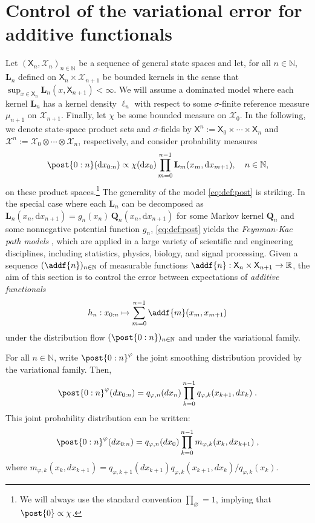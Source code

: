 \documentclass{article}
\newcommand{\Xfd}{\mathcal{X}}
\newcommand{\uksymbol}{\ell}
\newcommand{\ud}[1]{\uksymbol_{#1}}
\newcommand{\nset}{\mathbb{N}}
\newcommand{\1}{\mathbbm{1}}
\newcommand{\uk}[1]{\mathbf{L}_{#1}}
\newcommand{\tensprod}{\otimes}
\newcommand{\Xset}{\mathsf{X}}
\newcommand{\hk}{\kernel{Q}}
\newcommand{\md}[1]{g_{#1}}
\newcommand{\kernel}[1]{\mathbf{#1}}
\newcommand{\rset}{\ensuremath{\mathbb{R}}}
\newcommand{\rmd}{\ensuremath{\mathrm{d}}}
\newcommand{\eqdef}{\ensuremath{:=}}
\newcommand{\eqsp}{\;}
\begin{document}
\section{Control of the variational error for additive functionals}
Let $(\Xset_n, \Xfd_n)_{n \in \nset}$ be a sequence of general state spaces and let, for all $n \in \nset$, $\uk{n}$ defined on  $\Xset_n \times \Xfd_{n + 1}$ be bounded kernels in the sense that $\sup_{x \in \Xset_n} \uk{n}(x, \Xset_{n + 1}) < \infty$. We will assume a dominated model where each kernel $\uk{n}$ has a kernel density $\ud{n}$ with respect to some $\sigma$-finite reference measure $\mu_{n + 1}$ on $\Xfd_{n + 1}$. Finally, let $\chi$ be some bounded measure on $\Xfd_0$. In the following, we denote state-space product sets and $\sigma$-fields by $\Xset^n \eqdef \Xset_0 \times \cdots \times \Xset_n$ and $\Xfd^n \eqdef \Xfd_0 \tensprod \cdots \tensprod \Xfd_n$, respectively, and consider probability measures  
\begin{equation} \label{eq:def:post}
\post{0:n}(\rmd x_{0:n}) \propto \chi(\rmd x_0) \prod_{m = 0}^{n - 1} \uk{m}(x_m, \rmd x_{m + 1}), \quad n \in \nset, 
\end{equation}
on these product spaces.\footnote{We will always use the standard convention $\prod_{\varnothing} = 1$, implying that $\post{0} \propto \chi$.} The generality of the model \eqref{eq:def:post} is striking. In the special case where each $\uk{n}$ can be decomposed as $\uk{n}(x_n, \rmd x_{n + 1}) = \md{n}(x_n) \, \hk_n(x_n, \rmd x_{n + 1})$ for some Markov kernel $\hk_n$ and some nonnegative potential function $\md{n}$, \eqref{eq:def:post} yields the \emph{Feynman-Kac path models} \cite{delmoral:2004}, which are applied in a large variety of scientific and engineering disciplines, including statistics, physics, biology, and signal processing. 
Given a sequence $(\addf{n})_{n \in \nset}$ of measurable functions $\addf{n} : \Xset_n \times \Xset_{n + 1} \to \rset$, the aim of this section is to control  the error between expectations of \emph{additive functionals}   
\begin{equation} \label{eq:add:func}
    h_n:  x_{0:n} \mapsto \sum_{m = 0}^{n - 1} \addf{m}(x_m, x_{m + 1})
\end{equation}
under the distribution flow $(\post{0:n})_{n \in \nset}$ and under the variational family.   

For all $n\in\nset$, write $\post{0:n}^{\varphi}$ the joint smoothing distribution provided by the variational family. Then,
$$
 \post{0:n}^{\varphi}(d x_{0:n})= q_{\varphi,n}(dx_n)\prod_{k=0}^{n-1}q_{\varphi,k}(x_{k+1},dx_k)\eqsp.
$$
This joint probability distribution can be written:
$$
 \post{0:n}^{\varphi}(d x_{0:n})= q_{\varphi,n}(dx_0)\prod_{k=0}^{n-1}m_{\varphi,k}(x_{k},dx_{k+1})\eqsp,
$$
where $m_{\varphi,k}(x_{k},dx_{k+1}) =  q_{\varphi,k+1}(dx_{k+1})q_{\varphi,k}(x_{k+1},dx_k)/q_{\varphi,k}(x_k)$.
\end{document}
